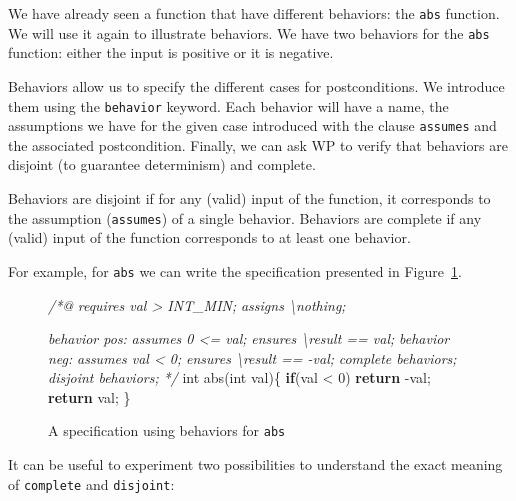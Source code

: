 \documentclass[12pt,francais,]{scrbook}
\newenvironment{Shaded}{}{}
\newcommand{\KeywordTok}[1]{\textcolor[rgb]{0.00,0.44,0.13}{\textbf{{#1}}}}
\newcommand{\DataTypeTok}[1]{\textcolor[rgb]{0.56,0.13,0.00}{{#1}}}
\newcommand{\DecValTok}[1]{\textcolor[rgb]{0.25,0.63,0.44}{{#1}}}
\newcommand{\CommentTok}[1]{\textcolor[rgb]{0.38,0.63,0.69}{\textit{{#1}}}}
\newcommand{\NormalTok}[1]{{#1}}
\begin{document}
We have already seen a function that have different behaviors: the
\texttt{abs} function. We will use it again to illustrate behaviors. We
have two behaviors for the \texttt{abs} function: either the input is
positive or it is negative.

Behaviors allow us to specify the different cases for postconditions. We
introduce them using the \texttt{behavior} keyword. Each behavior will
have a name, the assumptions we have for the given case introduced with
the clause \texttt{assumes} and the associated postcondition. Finally,
we can ask WP to verify that behaviors are disjoint (to guarantee
determinism) and complete.

Behaviors are disjoint if for any (valid) input of the function, it
corresponds to the assumption (\texttt{assumes}) of a single behavior.
Behaviors are complete if any (valid) input of the function corresponds
to at least one behavior.

For example, for \texttt{abs} we can write the specification presented
in Figure~\ref{fig:3-3-0-abs}.

\begin{figure}
  \centering
\begin{footnotesize}\begin{Shaded}
\begin{Highlighting}[]
\CommentTok{/*@}
\CommentTok{  requires val > INT_MIN;}
\CommentTok{  assigns  \textbackslash{}nothing;}

\CommentTok{  behavior pos:}
\CommentTok{    assumes 0 <= val;}
\CommentTok{    ensures \textbackslash{}result == val;}
\CommentTok{  }
\CommentTok{  behavior neg:}
\CommentTok{    assumes val < 0;}
\CommentTok{    ensures \textbackslash{}result == -val;}
\CommentTok{ }
\CommentTok{  complete behaviors;}
\CommentTok{  disjoint behaviors;}
\CommentTok{*/}
\DataTypeTok{int} \NormalTok{abs(}\DataTypeTok{int} \NormalTok{val)\{}
  \KeywordTok{if}\NormalTok{(val < }\DecValTok{0}\NormalTok{) }\KeywordTok{return} \NormalTok{-val;}
  \KeywordTok{return} \NormalTok{val;}
\NormalTok{\}}
\end{Highlighting}
\end{Shaded}\end{footnotesize}
\caption{A specification using behaviors for \texttt{abs}}
\label{fig:3-3-0-abs}
\end{figure}

It can be useful to experiment two possibilities to understand the exact
meaning of \texttt{complete} and \texttt{disjoint}:
\end{document}
